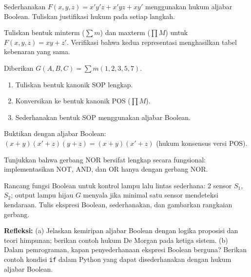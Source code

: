 \documentclass[../main]{subfiles}
\begin{document}

\begin{latihan}
  \item Sederhanakan $F(x, y, z) = x'y'z + x'yz + xy'$ menggunakan hukum aljabar Boolean. Tuliskan justifikasi hukum pada setiap langkah.
  \item Tuliskan bentuk minterm ($\sum m$) dan maxterm ($\prod M$) untuk $F(x, y, z) = xy + z'$. Verifikasi bahwa kedua representasi menghasilkan tabel kebenaran yang sama.
  \item Diberikan $G(A, B, C) = \sum m(1, 2, 3, 5, 7)$.
  \begin{enumerate}
    \item Tuliskan bentuk kanonik SOP lengkap.
    \item Konversikan ke bentuk kanonik POS ($\prod M$).
    \item Sederhanakan bentuk SOP menggunakan aljabar Boolean.
  \end{enumerate}
  \item Buktikan dengan aljabar Boolean: $(x + y)(x' + z)(y + z) = (x + y)(x' + z)$ (hukum konsensus versi POS).
  \item Tunjukkan bahwa gerbang NOR bersifat lengkap secara fungsional: implementasikan NOT, AND, dan OR hanya dengan gerbang NOR.
  \item Rancang fungsi Boolean untuk kontrol lampu lalu lintas sederhana: 2 sensor $S_1$, $S_2$; output lampu hijau $G$ menyala jika minimal satu sensor mendeteksi kendaraan. Tulis ekspresi Boolean, sederhanakan, dan gambarkan rangkaian gerbang.
  \item \textbf{Refleksi:} (a) Jelaskan kemiripan aljabar Boolean dengan logika proposisi dan teori himpunan; berikan contoh hukum De Morgan pada ketiga sistem. (b) Dalam pemrograman, kapan penyederhanaan ekspresi Boolean berguna? Berikan contoh kondisi \texttt{if} dalam Python yang dapat disederhanakan dengan hukum aljabar Boolean.
\end{latihan}

\end{document}
